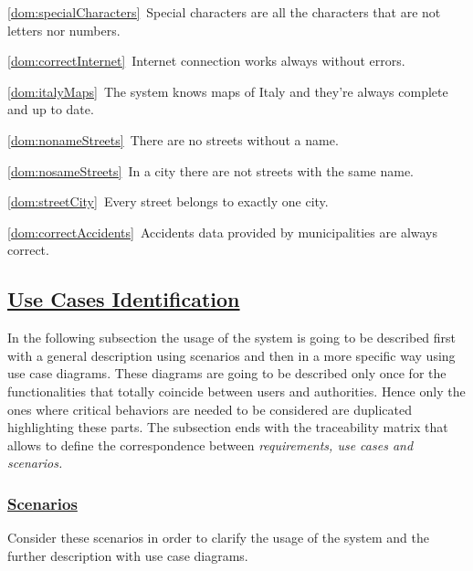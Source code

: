 \begin{description}
\begin{description}
					\item \ref{dom:specialCharacters}\ Special characters are all the characters that are not letters nor numbers.
					\item \ref{dom:correctInternet}\ Internet connection works always without errors.
					\item \ref{dom:italyMaps}\ The system knows maps of Italy and they’re always complete and up to date.
					\item \ref{dom:nonameStreets}\ There are no streets without a name.
					\item \ref{dom:nosameStreets}\ In a city there are not streets with the same name.
					\item \ref{dom:streetCity}\ Every street belongs to exactly one city.
					\item \ref{dom:correctAccidents}\ Accidents data provided by municipalities are always correct.	
				\end{description}		
		\end{description}

\subsection[Use Cases Identification]{\hyperlink{toc}{Use Cases Identification}}
	In the following subsection the usage of the system is going to be described first with a general description using scenarios and then in a more specific way using use case diagrams. These diagrams are going to be described only once for the functionalities that totally coincide between users and authorities. Hence only the ones where critical behaviors are needed to be considered are duplicated highlighting these parts. The subsection ends with the traceability matrix that allows to define the correspondence between \emph{requirements, use cases and scenarios.}
	
	\subsubsection[Scenarios]{\hyperlink{toc}{Scenarios}}
		Consider these scenarios in order to clarify the usage of the system and the further description with use case diagrams.
		
